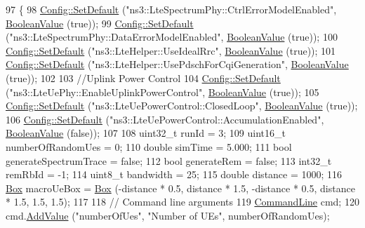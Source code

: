 \begin{DoxyCode}
97 \{
98   \hyperlink{group__config_ga2e7882df849d8ba4aaad31c934c40c06}{Config::SetDefault} (\textcolor{stringliteral}{"ns3::LteSpectrumPhy::CtrlErrorModelEnabled"}, 
      \hyperlink{classns3_1_1BooleanValue}{BooleanValue} (\textcolor{keyword}{true}));
99   \hyperlink{group__config_ga2e7882df849d8ba4aaad31c934c40c06}{Config::SetDefault} (\textcolor{stringliteral}{"ns3::LteSpectrumPhy::DataErrorModelEnabled"}, 
      \hyperlink{classns3_1_1BooleanValue}{BooleanValue} (\textcolor{keyword}{true}));
100   \hyperlink{group__config_ga2e7882df849d8ba4aaad31c934c40c06}{Config::SetDefault} (\textcolor{stringliteral}{"ns3::LteHelper::UseIdealRrc"}, 
      \hyperlink{classns3_1_1BooleanValue}{BooleanValue} (\textcolor{keyword}{true}));
101   \hyperlink{group__config_ga2e7882df849d8ba4aaad31c934c40c06}{Config::SetDefault} (\textcolor{stringliteral}{"ns3::LteHelper::UsePdschForCqiGeneration"}, 
      \hyperlink{classns3_1_1BooleanValue}{BooleanValue} (\textcolor{keyword}{true}));
102 
103   \textcolor{comment}{//Uplink Power Control}
104   \hyperlink{group__config_ga2e7882df849d8ba4aaad31c934c40c06}{Config::SetDefault} (\textcolor{stringliteral}{"ns3::LteUePhy::EnableUplinkPowerControl"}, 
      \hyperlink{classns3_1_1BooleanValue}{BooleanValue} (\textcolor{keyword}{true}));
105   \hyperlink{group__config_ga2e7882df849d8ba4aaad31c934c40c06}{Config::SetDefault} (\textcolor{stringliteral}{"ns3::LteUePowerControl::ClosedLoop"}, 
      \hyperlink{classns3_1_1BooleanValue}{BooleanValue} (\textcolor{keyword}{true}));
106   \hyperlink{group__config_ga2e7882df849d8ba4aaad31c934c40c06}{Config::SetDefault} (\textcolor{stringliteral}{"ns3::LteUePowerControl::AccumulationEnabled"}, 
      \hyperlink{classns3_1_1BooleanValue}{BooleanValue} (\textcolor{keyword}{false}));
107 
108   uint32\_t runId = 3;
109   uint16\_t numberOfRandomUes = 0;
110   \textcolor{keywordtype}{double} simTime = 5.000;
111   \textcolor{keywordtype}{bool} generateSpectrumTrace = \textcolor{keyword}{false};
112   \textcolor{keywordtype}{bool} generateRem = \textcolor{keyword}{false};
113   int32\_t remRbId = -1;
114   uint8\_t bandwidth = 25;
115   \textcolor{keywordtype}{double} distance = 1000;
116   \hyperlink{classns3_1_1Box}{Box} macroUeBox = \hyperlink{classns3_1_1Box}{Box} (-distance * 0.5, distance * 1.5, -distance * 0.5, distance * 1.5, 1.5, 1.5);
117 
118   \textcolor{comment}{// Command line arguments}
119   \hyperlink{classns3_1_1CommandLine}{CommandLine} cmd;
120   cmd.\hyperlink{classns3_1_1CommandLine_addcfb546c7ad4c8bd0965654d55beb8e}{AddValue} (\textcolor{stringliteral}{"numberOfUes"}, \textcolor{stringliteral}{"Number of UEs"}, numberOfRandomUes);

\end{DoxyCode}
